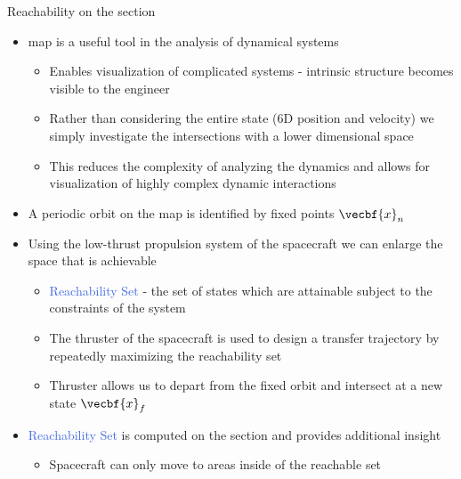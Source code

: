 \documentclass[final, usenames, dvipsnames]{beamer}
\newlength{\onecolwidth}
\def\Emph{\textcolor{RoyalBlue}}
\begin{document}
\begin{frame}[t]
\begin{columns}[T,onlytextwidth]
\begin{column}{\onecolwidth}
\begin{block}{Reachability on the \Poincare section}
    \begin{itemize}
        \item \Emph{\Poincare} map is a useful tool in the analysis of dynamical systems
        \begin{itemize}
            \item Enables visualization of complicated systems - intrinsic structure becomes visible to the engineer
            \item Rather than considering the entire state (6D position and velocity) we simply investigate the intersections with a lower dimensional space
            \item This reduces the complexity of analyzing the dynamics and allows for visualization of highly complex dynamic interactions
        \end{itemize} 
        \item A periodic orbit on the \Poincare map is identified by fixed points \( \vecbf{x}_n\)
        \item Using the low-thrust propulsion system of the spacecraft we can enlarge the space that is achievable 
        \begin{itemize}
            \item \Emph{Reachability Set} - the set of states which are attainable subject to the constraints of the system
            \item The thruster of the spacecraft is used to design a transfer trajectory by repeatedly maximizing the reachability set
            \item Thruster allows us to depart from the fixed orbit and intersect at a new state \( \vecbf{x}_f\)
        \end{itemize}
        \item \Emph{Reachability Set} is computed on the \Poincare section and provides additional insight
        \begin{itemize}
            \item Spacecraft can only move to areas inside of the reachable set
        \end{itemize}
    \end{itemize}

\end{block} %


\end{column}
\end{columns}
\end{frame}
\end{document}
